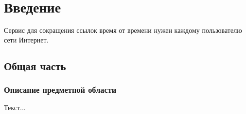 \documentclass[a5paper,12pt]{extreport}
\begin{document}

    \chapter{Введение}
    Сервис для сокращения ссылок время от времени нужен каждому пользователю сети Интернет.
    \section{Общая часть}
    \subsection{Описание предметной области}
    Текст...
\end{document}
